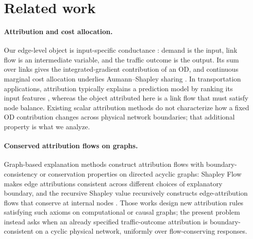 \documentclass[a4paper,fleqn]{cas-sc}
\begin{document}
\section{Related work}\label{sec:related}
\paragraph{Attribution and cost allocation.}
Our edge-level object is input-specific conductance
\citep{dhamdhere2019important,lundstrom2022rigorous}: demand is the input,
link flow is an intermediate variable, and the traffic outcome is the output.
Its sum over links gives the integrated-gradient contribution of an OD, and
continuous marginal cost allocation underlies Aumann--Shapley sharing
\citep{aumann1974values,billera1978internal}. In transportation
applications, attribution typically explains a prediction model by ranking
its input features \citep{sariyer2024leveraging,guo2024towards}, whereas
the object attributed here is a link flow that must satisfy node balance.
Existing scalar attribution methods do not characterize how a fixed OD
contribution changes across physical network boundaries; that additional
property is what we analyze.

\paragraph{Conserved attribution flows on graphs.}
Graph-based explanation methods construct attribution flows with
boundary-consistency or conservation properties on directed acyclic
graphs: Shapley Flow makes edge attributions consistent across
different choices of explanatory boundary, and the recursive Shapley
value recursively constructs edge-attribution flows that conserve at
internal nodes \citep{wang2021shapleyflow,singal2021rsv}. Those works
design new attribution rules satisfying such axioms on computational or
causal graphs; the present problem instead asks when an already
specified traffic-outcome attribution is boundary-consistent on a
cyclic physical network, uniformly over flow-conserving responses.
\end{document}
